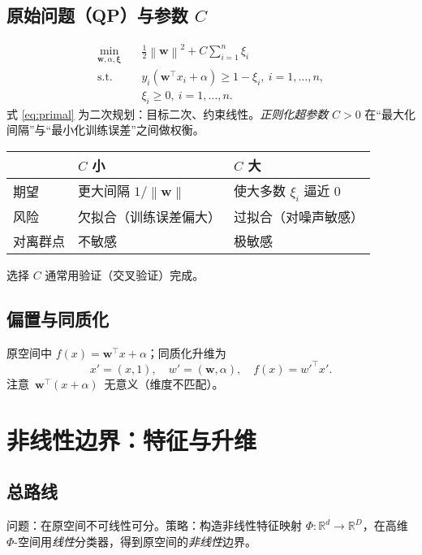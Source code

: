 \documentclass[10.5pt,hyperref,a4paper,UTF8]{ctexart}
\newcommand{\R}{\mathbb{R}}
\newcommand{\norm}[1]{\left\lVert #1\right\rVert}
\theoremstyle{definition}
\begin{document}
\subsection{原始问题（QP）与参数 \(C\)}
\begin{equation}\label{eq:primal}
\begin{aligned}
\min_{\bm w,\alpha,\bm\xi}\quad & \frac{1}{2}\norm{\bm w}^2 + C\sum_{i=1}^n \xi_i\\
\text{s.t.}\quad & y_i(\bm w^\top x_i+\alpha)\ge 1-\xi_i,\ i=1,\dots,n,\\
& \xi_i\ge0,\ i=1,\dots,n.
\end{aligned}
\end{equation}
式 \eqref{eq:primal} 为二次规划：目标二次、约束线性。\emph{正则化超参数} $C>0$ 在“最大化间隔”与“最小化训练误差”之间做权衡。
\begin{center}
\begin{tabular}{@{}lll@{}}
\toprule
& $C$ 小 & $C$ 大\\
\midrule
期望 & 更大间隔 $1/\norm{\bm w}$ & 使大多数 $\xi_i$ 逼近 $0$\\
风险 & 欠拟合（训练误差偏大） & 过拟合（对噪声敏感）\\
对离群点 & 不敏感 & 极敏感\\
\bottomrule
\end{tabular}
\end{center}
选择 $C$ 通常用验证（交叉验证）完成。

\subsection{偏置与同质化}
原空间中 $f(x)=\bm w^\top x+\alpha$；同质化升维为
\[
x'=(x,1),\quad w'=(\bm w,\alpha),\quad f(x)=w'^\top x'.
\]
注意 $\,\bm w^\top(x+\alpha)\,$ 无意义（维度不匹配）。

\section{非线性边界：特征与升维}
\subsection{总路线}
问题：在原空间不可线性可分。策略：构造非线性特征映射 $\Phi:\R^d\to\R^D$，在高维 $\Phi$-空间用\emph{线性}分类器，得到原空间的\emph{非线性}边界。
\end{document}
